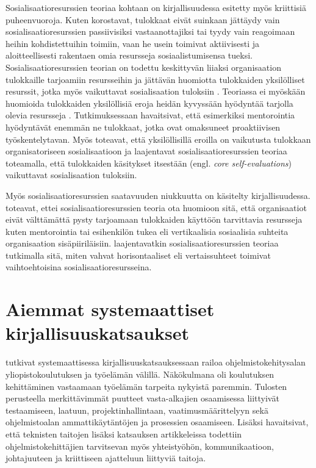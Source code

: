 \documentclass[utf8]{gradu3}
\begin{document}
Sosialisaatioresurssien teoriaa kohtaan on kirjallisuudessa esitetty myös kriittisiä puheenvuoroja. Kuten \textcite{zhao-ym-2022} korostavat, tulokkaat eivät suinkaan jättäydy vain sosialisaatioresurssien passiivisiksi vastaanottajiksi tai tyydy vain reagoimaan heihin kohdistettuihin toimiin, vaan he usein toimivat aktiivisesti ja aloitteellisesti rakentaen omia resursseja sosiaalistumisensa tueksi. Sosialisaatioresurssien teorian on todettu keskittyvän liiaksi organisaation tulokkaille tarjoamiin resursseihin ja jättävän huomiotta tulokkaiden yksilölliset resurssit, jotka myös vaikuttavat sosialisaation tuloksiin %
\parencites%
    {fang-ym-2016}%
    {cai-ym-2021}%
\relax
. Teoriassa ei myöskään huomioida tulokkaiden yksilöllisiä eroja heidän kyvyssään hyödyntää tarjolla olevia resursseja \parencite{cai-ym-2021}. Tutkimuksessaan \textcite{cai-ym-2021} havaitsivat, että esimerkiksi mentorointia hyödyntävät enemmän ne tulokkaat, jotka ovat omaksuneet proaktiivisen työskentelytavan. Myös \textcite{fang-ym-2016} toteavat, että yksilöllisillä eroilla on vaikutusta tulokkaan organisatoriseen sosialisaatioon ja laajentavat sosialisaatioresurssien teoriaa toteamalla, että tulokkaiden käsitykset itsestään (engl. \textit{core self-evaluations}) vaikuttavat sosialisaation tuloksiin.

Myös sosialisaatioresurssien saatavuuden niukkuutta on käsitelty kirjallisuudessa. \textcite{fang-ym-2016} toteavat, ettei sosialisaatioresurssien teoria ota huomioon sitä, että organisaatiot eivät välttämättä pysty tarjoamaan tulokkaiden käyttöön tarvittavia resursseja kuten mentorointia tai esihenkilön tukea eli vertikaalisia sosiaalisia suhteita organisaation sisäpiiriläisiin. \textcite{fang-ym-2016} laajentavatkin sosialisaatioresurssien teoriaa tutkimalla sitä, miten vahvat horisontaaliset eli vertaissuhteet toimivat vaihtoehtoisina sosialisaatioresursseina. 

\section{Aiemmat systemaattiset kirjallisuuskatsaukset}

\textcite{garousi-ym-2020} tutkivat systemaattisessa kirjallisuuskatsauksessaan railoa ohjelmistokehitysalan yliopistokoulutuksen ja työelämän välillä. Näkökulmana oli koulutuksen kehittäminen vastaamaan työelämän tarpeita nykyistä paremmin. Tulosten perusteella merkittävimmät puutteet vasta-alkajien osaamisessa liittyivät testaamiseen, laatuun, projektinhallintaan, vaatimusmäärittelyyn sekä ohjelmistoalan ammattikäytäntöjen ja prosessien osaamiseen. Lisäksi \textcite{garousi-ym-2020} havaitsivat, että teknisten taitojen lisäksi katsauksen artikkeleissa todettiin ohjelmistokehittäjien tarvitsevan myös yhteistyöhön, kommunikaatioon, johtajuuteen ja kriittiseen ajatteluun liittyviä taitoja. 
\end{document}
